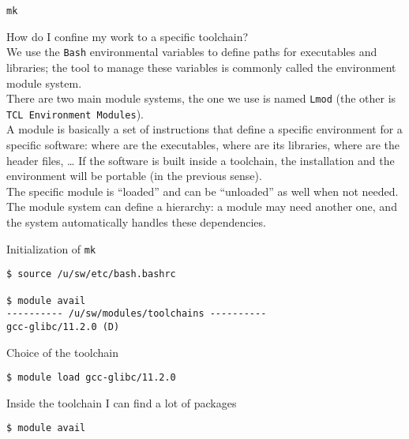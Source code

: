 \documentclass[10pt]{beamer}
\begin{document}
\begin{frame}{\texttt{mk}}

  How do I confine my work to a specific toolchain?\\[3mm]

  We use the \texttt{Bash} environmental variables to define paths for executables and libraries; the tool to manage these variables is commonly called 
  the environment module system.\\[3mm]

  There are two main module systems, the one we use is named \texttt{Lmod} (the other is \texttt{TCL Environment Modules}).\\[3mm]

  A module is basically a set of instructions that define a specific environment for a specific software: where are the executables, where are its libraries, where are the header files, … 
  If the software is built inside a toolchain, the installation and the environment  will be portable (in the previous sense).\\[3mm]

  The specific module is “loaded” and can be “unloaded” as well when not needed.\\[3mm]

  The module system can define a hierarchy: a module may need another one, and the system automatically handles these dependencies.

\end{frame}

\begin{frame}[fragile]

  Initialization of \texttt{mk}

\begin{verbatim}
$ source /u/sw/etc/bash.bashrc

$ module avail
---------- /u/sw/modules/toolchains ----------
gcc-glibc/11.2.0 (D)
\end{verbatim}

Choice of the toolchain
\begin{verbatim}
$ module load gcc-glibc/11.2.0
\end{verbatim}

Inside the toolchain I can find a lot of packages
\begin{verbatim}
$ module avail
\end{verbatim}
\end{frame}
\end{document}

